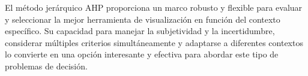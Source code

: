 \documentclass[
  11pt,
  bookmarksnumbered]{article}
\begin{document}
El método jerárquico AHP proporciona un marco robusto y flexible para evaluar y seleccionar la mejor herramienta de visualización en función del contexto específico. Su capacidad para manejar la subjetividad y la incertidumbre, considerar múltiples criterios simultáneamente y adaptarse a diferentes contextos lo convierte en una opción interesante y efectiva para abordar este tipo de problemas de decisión.

\vspace{2cm}
\newpage

\printbibliography
\end{document}
